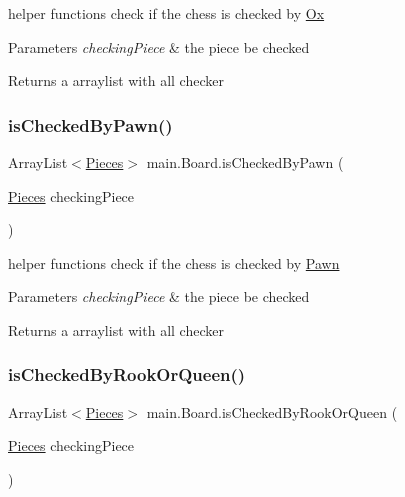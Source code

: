 helper functions check if the chess is checked by \mbox{\hyperlink{classmain_1_1_ox}{Ox}} 
\begin{DoxyParams}{Parameters}
{\em checking\+Piece} & the piece be checked \\
\hline
\end{DoxyParams}
\begin{DoxyReturn}{Returns}
a arraylist with all checker 
\end{DoxyReturn}
\mbox{\label{classmain_1_1_board_adced662a6dafccc6a509a9fb0b699018}} 
\subsubsection{\texorpdfstring{is\+Checked\+By\+Pawn()}{isCheckedByPawn()}}
{\footnotesize\ttfamily Array\+List$<$\mbox{\hyperlink{classmain_1_1_pieces}{Pieces}}$>$ main.\+Board.\+is\+Checked\+By\+Pawn (\begin{DoxyParamCaption}\item[{\mbox{\hyperlink{classmain_1_1_pieces}{Pieces}}}]{checking\+Piece }\end{DoxyParamCaption})\hspace{0.3cm}{\ttfamily [inline]}}

helper functions check if the chess is checked by \mbox{\hyperlink{classmain_1_1_pawn}{Pawn}} 
\begin{DoxyParams}{Parameters}
{\em checking\+Piece} & the piece be checked \\
\hline
\end{DoxyParams}
\begin{DoxyReturn}{Returns}
a arraylist with all checker 
\end{DoxyReturn}
\mbox{\label{classmain_1_1_board_aeae5c2e64b2030c15c915b8a8f60a224}} 
\subsubsection{\texorpdfstring{is\+Checked\+By\+Rook\+Or\+Queen()}{isCheckedByRookOrQueen()}}
{\footnotesize\ttfamily Array\+List$<$\mbox{\hyperlink{classmain_1_1_pieces}{Pieces}}$>$ main.\+Board.\+is\+Checked\+By\+Rook\+Or\+Queen (\begin{DoxyParamCaption}\item[{\mbox{\hyperlink{classmain_1_1_pieces}{Pieces}}}]{checking\+Piece }\end{DoxyParamCaption})\hspace{0.3cm}{\ttfamily [inline]}}

